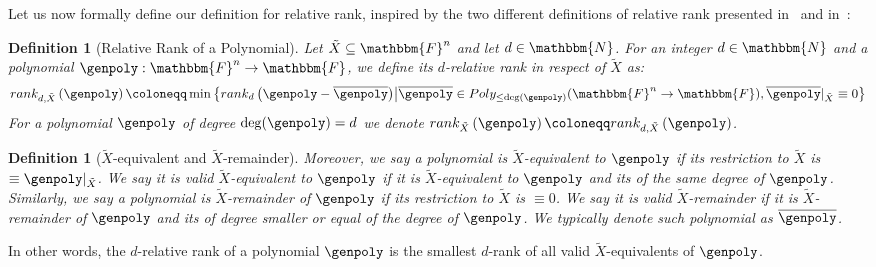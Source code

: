 \documentclass[10pt,a4paper]{article}
\newtheorem{definition}[theorem]{Definition}
\newcommand{\definedas}[0]{\coloneqq}
\newcommand{\parens}[1]{\left( #1 \right)}
\newcommand{\set}[1]{\left\{ #1 \right\}}
\newcommand{\suchthat}[0]{\middle|}
\newcommand{\basefield}[0]{\mathbbm{F}}
\newcommand{\blocklength}[0]{n}
\newcommand{\field}[0]{\basefield^{\blocklength}}
\newcommand{\degree}[0]{d}
\newcommand{\funcdef}[3]{#1:#2\rightarrow#3}
\newcommand{\restrictfunc}[2]{#1|_{#2}}
\newcommand{\allpolyset}[3]{Poly_{#1}(#2\rightarrow#3)}
\newcommand{\naturalnumbersset}[0]{\mathbbm{N}}
\newcommand{\relativeremainder}[1]{\overline{#1}}
\newcommand{\variety}{{\tilde{X}}}
\newcommand{\drank}[2]{rank_{#1} \parens{#2}}
\newcommand{\relrank}[2]{rank_{#1} \parens{#2}}
\newcommand{\drelrank}[3]{rank_{{#1}, {#2}} \parens{#3}}
\begin{document}
Let us now formally define our definition for relative rank, inspired by the two different definitions of relative rank presented in~\cite[Definition 1.6]{lampert2021relative}
and in~\cite[Definition 1.3]{gowers2022equidistributionhighrankpolynomialsvariables}:
\begin{definition}[Relative Rank of a Polynomial]\label{def:relative-rank-of-polynomial}
    Let $\variety \subseteq \field$ and let $\degree \in \naturalnumbersset$.
    For an integer $\degree \in \naturalnumbersset$ and a polynomial $\funcdef{\genpoly}{\field}{\basefield}$, we define its \emph{$\degree$-relative rank} in respect of $\variety$ as:
    \[
        \drelrank{\degree}{\variety}{\genpoly} \definedas \min \set{\drank{\degree}{\genpoly - \relativeremainder{\genpoly}} \suchthat
        \relativeremainder{\genpoly} \in \allpolyset{\leq \deg(\genpoly)}{\field}{\basefield}, \restrictfunc{\relativeremainder{\genpoly}}{\variety} \equiv 0}
    \]
    For a polynomial $\genpoly$ of degree $\deg(\genpoly) = \degree$ we denote $\relrank{\variety}{\genpoly} \definedas \drelrank{\degree}{\variety}{\genpoly}$.
\end{definition}
\begin{definition}[$\variety$-equivalent and $\variety$-remainder]
    Moreover, we say a polynomial is \emph{$\variety$-equivalent} to $\genpoly$ if its restriction to $\variety$ is $\equiv \restrictfunc{\genpoly}{\variety}$.
    We say it is \emph{valid $\variety$-equivalent to $\genpoly$} if it is $\variety$-equivalent to $\genpoly$ and its of the \emph{same} degree of $\genpoly$.
    \newline
    Similarly, we say a polynomial is \emph{$\variety$-remainder} of $\genpoly$ if its restriction to $\variety$ is \emph{$\equiv 0$}.
    We say it is \emph{valid $\variety$-remainder} if it is $\variety$-remainder of $\genpoly$ and its of degree \emph{smaller or equal} of the degree of $\genpoly$.
    \newline
    We typically denote such polynomial as $\relativeremainder{\genpoly}$.
\end{definition}
In other words, the $\degree$-relative rank of a polynomial $\genpoly$ is the smallest $\degree$-rank of all valid $\variety$-equivalents of $\genpoly$.
\end{document}
